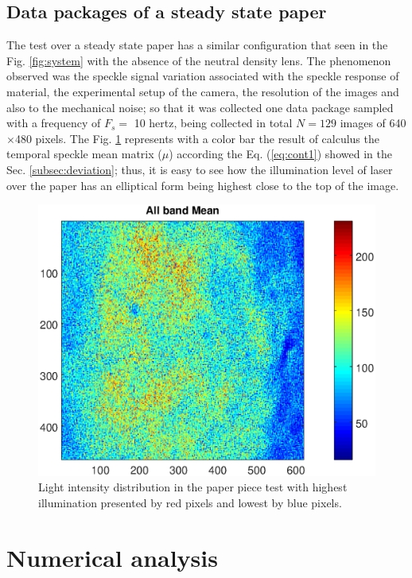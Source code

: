 \documentclass[review]{elsarticle}
\begin{document}
\subsection{Data packages of a steady state paper}
\label{sec:descriptionpaper}
The test over a steady state paper has a similar configuration that seen in
the Fig. \ref{fig:system} with the absence of 
the neutral density lens. 
The phenomenon observed was the speckle signal  variation associated with  the speckle response of material, 
the experimental setup of the camera, the resolution of the images and also to the mechanical noise; 
so that it was collected one data package sampled with a frequency of $F_s=$ 10 hertz, being 
collected in total $N=129$ images of 640$\times$480 pixels.
The Fig. \ref{fig:meanpaper} represents
with a color bar the result of  calculus the temporal speckle mean matrix ($\mu$) according the Eq. (\ref{eq:cont1})
showed in the Sec. \ref{subsec:deviation}; thus, it is easy to see how the
illumination level of laser over the paper has an elliptical form being highest 
close to the top of the image.
\begin{figure}[h!]
\centering
\includegraphics[width=0.85\columnwidth]{meanall.eps}
\caption{Light intensity distribution in the paper piece test with highest illumination presented by red pixels and lowest by blue pixels.}
\label{fig:meanpaper}
\end{figure}

\section{Numerical analysis}
\label{sec:analysis}
\end{document}
